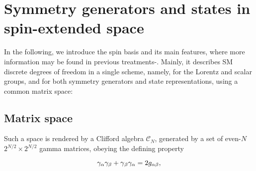 \documentclass[12pt]{article}
\renewcommand\[{\begin{dmath}}
\renewcommand\]{\end{dmath}}
\begin{document}






\section{Symmetry generators and states in spin-extended space }




In the following, we introduce  the spin basis  and its  main features, where more information may be found in previous
treatments\cite{BesproRicardo}-\cite{bespro9m1}.
Mainly, it describes SM discrete degrees of freedom in a  single scheme, namely,  for the Lorentz    and scalar groups,   and for   both symmetry generators   and state  representations,
using a common matrix space:


\subsection{Matrix space}

Such a  space is
rendered by a   Clifford algebra $\mathcal{C}_{N}$,
  generated by a set of   even-$N$   $2^{N/2}\times 2^{N/2}$   gamma  matrices,
  obeying the defining property\cite{Snygg}

\begin{equation}
\gamma_{\alpha}\gamma_{\beta}+\gamma\emph{}_{\beta}\gamma_{\alpha}=2g_{\alpha\beta},\label{eq:1}
\end{equation}
\end{document}
